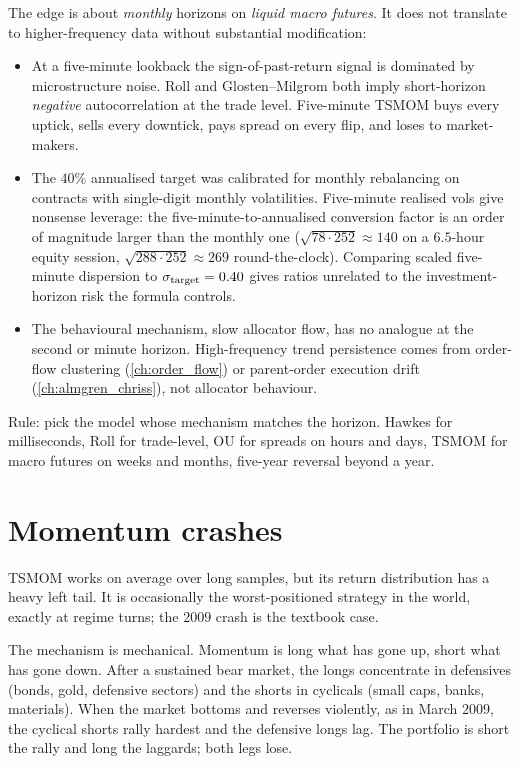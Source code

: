 \begin{pitfallbox}
\label{pf:wrong_horizon}
The \citeMOP{} edge is about \emph{monthly} horizons on
\emph{liquid macro futures}. It does not translate to
higher-frequency data without substantial modification:
\begin{itemize}
  \item At a five-minute lookback the sign-of-past-return signal
  is dominated by microstructure noise. Roll and
  Glosten--Milgrom both imply short-horizon \emph{negative}
  autocorrelation at the trade level. Five-minute TSMOM buys
  every uptick, sells every downtick, pays spread on every flip,
  and loses to market-makers.
  \item The $40\%$ annualised target was calibrated for monthly
  rebalancing on contracts with single-digit monthly volatilities.
  Five-minute realised vols give nonsense leverage: the
  five-minute-to-annualised conversion factor is an order of
  magnitude larger than the monthly one
  ($\sqrt{78 \cdot 252} \approx 140$ on a $6.5$-hour equity
  session, $\sqrt{288 \cdot 252} \approx 269$ round-the-clock).
  Comparing scaled five-minute dispersion to
  $\sigma_{\text{target}} = 0.40$ gives ratios unrelated to the
  investment-horizon risk the formula controls.
  \item The behavioural mechanism, slow allocator flow, has
  no analogue at the second or minute horizon. High-frequency
  trend persistence comes from order-flow clustering
  (\cref{ch:order_flow}) or parent-order execution drift
  (\cref{ch:almgren_chriss}), not allocator behaviour.
\end{itemize}
Rule: pick the model whose mechanism matches the horizon. Hawkes
for milliseconds, Roll for trade-level, OU for spreads on hours
and days, TSMOM for macro futures on weeks and months, five-year
reversal beyond a year.
\end{pitfallbox}

\section{Momentum crashes}
\label{sec:ch12_crashes}

TSMOM works on average over long samples, but its return
distribution has a heavy left tail. It is occasionally the
worst-positioned strategy in the world, exactly at regime turns;
the $2009$ crash is the textbook case.

The mechanism is mechanical. Momentum is long what has gone up,
short what has gone down. After a sustained bear market, the longs
concentrate in defensives (bonds, gold, defensive sectors) and the
shorts in cyclicals (small caps, banks, materials). When the
market bottoms and reverses violently, as in March $2009$,
the cyclical shorts rally hardest and the defensive longs lag. The
portfolio is short the rally and long the laggards; both legs
lose.

